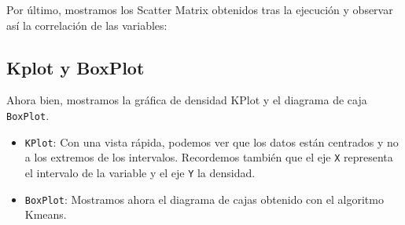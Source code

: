 	Por último, mostramos los Scatter Matrix obtenidos tras la ejecución y observar así la correlación de las variables:
	
	\begin{figure}[H]
		\centering
		
	\end{figure}
	
	
	\begin{figure}[H]
		\centering
		
		
		
	\end{figure}
	
	
	\begin{figure}[H]
		\centering
		
	\end{figure}



	\subsection{Kplot y BoxPlot}
	
	Ahora bien, mostramos la gráfica de densidad KPlot y el diagrama de caja \texttt{BoxPlot}.
	
	\begin{itemize}
		\item \texttt{KPlot}: Con una vista rápida, podemos ver que los datos están centrados y no a los extremos de los intervalos.  Recordemos también que el eje \texttt{X} representa el intervalo de la variable y el eje \texttt{Y} la densidad.
		
		
		\begin{figure}[H]
			\centering
			
		\end{figure}
	
	
		\item \texttt{BoxPlot}: Mostramos ahora el diagrama de cajas obtenido con el algoritmo Kmeans.
		
		
		
		\begin{figure}[H]
			\centering
			
		\end{figure}
	\end{itemize}
	





